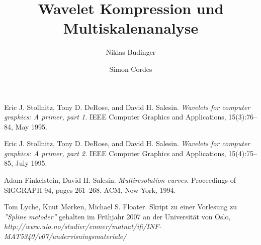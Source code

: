 \documentclass{article}
\begin{document}
%
\title{Wavelet Kompression und Multiskalenanalyse}
\author{Niklas Budinger \and Simon Cordes}
\maketitle










\begin{thebibliography}{9}

Eric J. Stollnitz, Tony D. DeRose, and David H. Salesin.
\textit{Wavelets for computer graphics: A primer, part 1.}
IEEE Computer Graphics and Applications, 15(3):76–84,
May 1995.

Eric J. Stollnitz, Tony D. DeRose, and David H. Salesin.
\textit{Wavelets for computer graphics: A primer, part 2.}
IEEE Computer Graphics and Applications, 15(4):75–85,
July 1995.

Adam Finkelstein, David H. Salesin.
\textit{Multiresolution curves.}
Proceedings of SIGGRAPH 94, pages 261–268.
ACM, New York, 1994.

Tom Lyche, Knut Mørken, Michael S. Floater.
Skript zu einer Vorlesung zu \textit{''Spline metoder''} gehalten im Frühjahr 2007 an der Universität von Oslo,
\textit{http://www.uio.no/studier/emner/matnat/ifi/INF-MAT5340/v07/undervisningsmateriale/}

\end{thebibliography}
\end{document}
